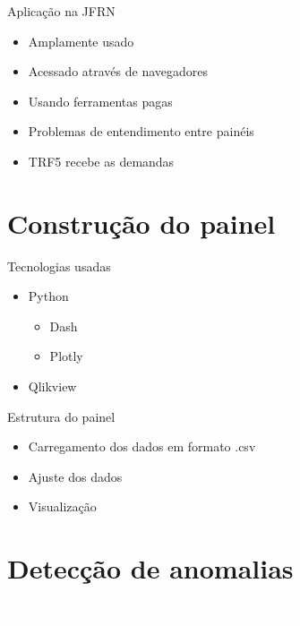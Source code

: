 \documentclass[10pt,t]{beamer}
\begin{document}
\begin{frame}{Aplicação na JFRN}\label{colorpalette}
\vspace{8pt}
    \begin{itemize}
    	\item Amplamente usado
    	\item Acessado através de navegadores
    	\item Usando ferramentas pagas
    	\item Problemas de entendimento entre painéis
    	\item TRF5 recebe as demandas
    \end{itemize}
\end{frame} 

\section{Construção do painel}

\begin{frame}{Tecnologias usadas}
\vspace{8pt}
    \begin{itemize}
        \item Python
        \begin{itemize}
            \item Dash
            \item Plotly
        \end{itemize}
        \item Qlikview
    \end{itemize}
\end{frame}

\begin{frame}{Estrutura do painel}
\vspace{8pt}
    \begin{itemize}
        \item Carregamento dos dados em formato .csv
        \item Ajuste dos dados
        \item Visualização
    \end{itemize}
\end{frame}

\section{Detecção de anomalias}




{

\begin{frame}[c,plain]{}
    \centering
    \textcolor{white}{Obrigado!}
\end{frame}

}
\end{document}
